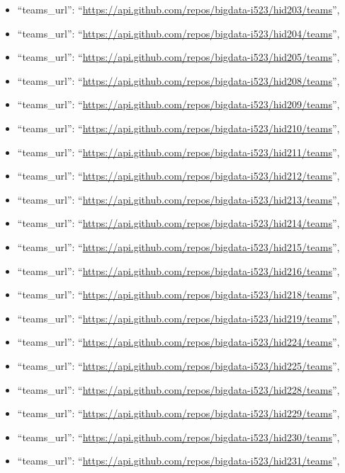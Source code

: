 \begin{itemize}
\item
  ``teams\_url'':
  ``\url{https://api.github.com/repos/bigdata-i523/hid203/teams}'',
\item
  ``teams\_url'':
  ``\url{https://api.github.com/repos/bigdata-i523/hid204/teams}'',
\item
  ``teams\_url'':
  ``\url{https://api.github.com/repos/bigdata-i523/hid205/teams}'',
\item
  ``teams\_url'':
  ``\url{https://api.github.com/repos/bigdata-i523/hid208/teams}'',
\item
  ``teams\_url'':
  ``\url{https://api.github.com/repos/bigdata-i523/hid209/teams}'',
\item
  ``teams\_url'':
  ``\url{https://api.github.com/repos/bigdata-i523/hid210/teams}'',
\item
  ``teams\_url'':
  ``\url{https://api.github.com/repos/bigdata-i523/hid211/teams}'',
\item
  ``teams\_url'':
  ``\url{https://api.github.com/repos/bigdata-i523/hid212/teams}'',
\item
  ``teams\_url'':
  ``\url{https://api.github.com/repos/bigdata-i523/hid213/teams}'',
\item
  ``teams\_url'':
  ``\url{https://api.github.com/repos/bigdata-i523/hid214/teams}'',
\item
  ``teams\_url'':
  ``\url{https://api.github.com/repos/bigdata-i523/hid215/teams}'',
\item
  ``teams\_url'':
  ``\url{https://api.github.com/repos/bigdata-i523/hid216/teams}'',
\item
  ``teams\_url'':
  ``\url{https://api.github.com/repos/bigdata-i523/hid218/teams}'',
\item
  ``teams\_url'':
  ``\url{https://api.github.com/repos/bigdata-i523/hid219/teams}'',
\item
  ``teams\_url'':
  ``\url{https://api.github.com/repos/bigdata-i523/hid224/teams}'',
\item
  ``teams\_url'':
  ``\url{https://api.github.com/repos/bigdata-i523/hid225/teams}'',
\item
  ``teams\_url'':
  ``\url{https://api.github.com/repos/bigdata-i523/hid228/teams}'',
\item
  ``teams\_url'':
  ``\url{https://api.github.com/repos/bigdata-i523/hid229/teams}'',
\item
  ``teams\_url'':
  ``\url{https://api.github.com/repos/bigdata-i523/hid230/teams}'',
\item
  ``teams\_url'':
  ``\url{https://api.github.com/repos/bigdata-i523/hid231/teams}'',

\end{itemize}

